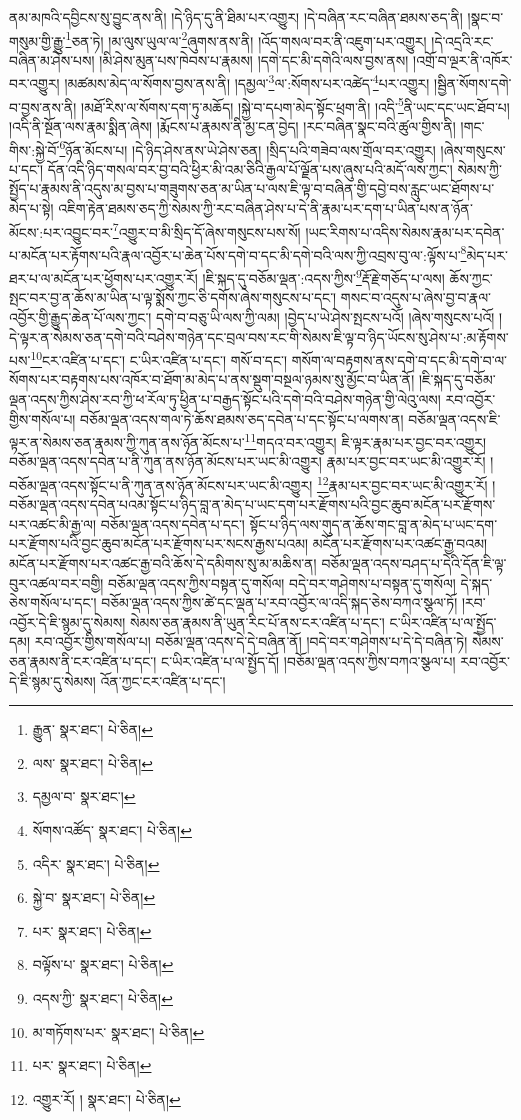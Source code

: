 ནམ་མཁའི་དབྱིངས་སུ་བྱུང་ནས་ནི། །དེ་ཉིད་དུ་ནི་ཐིམ་པར་འགྱུར། །དེ་བཞིན་རང་བཞིན་ཐམས་ཅད་ནི། །སྣང་བ་གསུམ་གྱི་རྒྱུ་\footnote{རྒྱུན་  སྣར་ཐང་།  པེ་ཅིན། }ཅན་ཏེ། །མ་ལུས་ཡུལ་ལ་\footnote{ལས་  སྣར་ཐང་།  པེ་ཅིན། }ཞུགས་ནས་ནི། །འོད་གསལ་བར་ནི་འཇུག་པར་འགྱུར། །དེ་འདྲའི་རང་བཞིན་མ་ཤེས་པས། །མི་ཤེས་མུན་པས་ཁེབས་པ་རྣམས། །དགེ་དང་མི་དགེའི་ལས་བྱས་ནས། །འགྲོ་བ་ལྔར་ནི་འཁོར་བར་འགྱུར། །མཚམས་མེད་ལ་སོགས་བྱས་ནས་ནི། །དམྱལ་\footnote{དམྱལ་བ་  སྣར་ཐང་། }ལ་:སོགས་པར་འཚེད་\footnote{སོགས་འཚོད་  སྣར་ཐང་།  པེ་ཅིན། }པར་འགྱུར། །སྦྱིན་སོགས་དགེ་བ་བྱས་ནས་ནི། །མཐོ་རིས་ལ་སོགས་དག་ཏུ་མཆོད། །སྐྱེ་བ་དཔག་མེད་སྟོང་ཕྲག་ནི། །འདི་\footnote{འདིར་  སྣར་ཐང་།  པེ་ཅིན། }ནི་ཡང་དང་ཡང་ཐོབ་པ། །འདི་ནི་སྔོན་ལས་རྣམ་སྨིན་ཞེས། །རྨོངས་པ་རྣམས་ནི་མྱ་ངན་བྱེད། །རང་བཞིན་སྣང་བའི་ཚུལ་གྱིས་ནི། །གང་གིས་:སྐྱེ་བོ་\footnote{སྐྱེ་བ་  སྣར་ཐང་།  པེ་ཅིན། }ཉོན་མོངས་པ། །དེ་ཉིད་ཤེས་ནས་ཡེ་ཤེས་ཅན། །སྲིད་པའི་གཟེབ་ལས་གྲོལ་བར་འགྱུར། །ཞེས་གསུངས་པ་དང་། དོན་འདི་ཉིད་གསལ་བར་བྱ་བའི་ཕྱིར་མི་འམ་ཅིའི་རྒྱལ་པོ་ལྗོན་པས་ཞུས་པའི་མདོ་ལས་ཀྱང་། སེམས་ཀྱི་སྤྱོད་པ་རྣམས་ནི་འདུས་མ་བྱས་པ་གཟུགས་ཅན་མ་ཡིན་པ་ལས་ཇི་ལྟ་བ་བཞིན་གྱི་དབྱེ་བས་རླུང་ཡང་ཐོགས་པ་མེད་པ་སྟེ། འཇིག་རྟེན་ཐམས་ཅད་ཀྱི་སེམས་ཀྱི་རང་བཞིན་ཤེས་པ་དེ་ནི་རྣམ་པར་དག་པ་ཡིན་པས་ན་ཉོན་མོངས་:པར་འབྱུང་བར་\footnote{པར་  སྣར་ཐང་།  པེ་ཅིན། }འགྱུར་བ་མི་སྲིད་དོ་ཞེས་གསུངས་པས་སོ། །ཡང་རིགས་པ་འདིས་སེམས་རྣམ་པར་དབེན་པ་མངོན་པར་རྟོགས་པའི་རྣལ་འབྱོར་པ་ཆེན་པོས་དགེ་བ་དང་མི་དགེ་བའི་ལས་ཀྱི་འབྲས་བུ་ལ་:ལྟོས་པ་\footnote{བལྟོས་པ་  སྣར་ཐང་།  པེ་ཅིན། }མེད་པར་ཐར་པ་ལ་མངོན་པར་ཕྱོགས་པར་འགྱུར་རོ། །ཇི་སྐད་དུ་བཅོམ་ལྡན་:འདས་ཀྱིས་\footnote{འདས་ཀྱི་  སྣར་ཐང་།  པེ་ཅིན། }རྡོ་རྗེ་གཅོད་པ་ལས། ཆོས་ཀྱང་སྤང་བར་བྱ་ན་ཆོས་མ་ཡིན་པ་ལྟ་སྨོས་ཀྱང་ཅི་དགོས་ཞེས་གསུངས་པ་དང་། གསང་བ་འདུས་པ་ཞེས་བྱ་བ་རྣལ་འབྱོར་གྱི་རྒྱུད་ཆེན་པོ་ལས་ཀྱང་། དགེ་བ་བཅུ་ཡི་ལས་ཀྱི་ལམ། །བྱེད་པ་ཡེ་ཤེས་སྤངས་པའོ། །ཞེས་གསུངས་པའོ། །དེ་ལྟར་ན་སེམས་ཅན་དགེ་བའི་བཤེས་གཉེན་དང་བྲལ་བས་རང་གི་སེམས་ཇི་ལྟ་བ་ཉིད་ཡོངས་སུ་ཤེས་པ་:མ་རྟོགས་པས་\footnote{མ་གཏོགས་པར་  སྣར་ཐང་།  པེ་ཅིན། }ངར་འཛིན་པ་དང་། ང་ཡིར་འཛིན་པ་དང་། གསོ་བ་དང་། གསོག་ལ་བརྟགས་ནས་དགེ་བ་དང་མི་དགེ་བ་ལ་སོགས་པར་བརྟགས་པས་འཁོར་བ་ཐོག་མ་མེད་པ་ནས་སྡུག་བསྔལ་ཉམས་སུ་མྱོང་བ་ཡིན་ནོ། །ཇི་སྐད་དུ་བཅོམ་ལྡན་འདས་ཀྱིས་ཤེས་རབ་ཀྱི་ཕ་རོལ་ཏུ་ཕྱིན་པ་བརྒྱད་སྟོང་པའི་དགེ་བའི་བཤེས་གཉེན་གྱི་ལེའུ་ལས། རབ་འབྱོར་གྱིས་གསོལ་པ། བཅོམ་ལྡན་འདས་གལ་ཏེ་ཆོས་ཐམས་ཅད་དབེན་པ་དང་སྟོང་པ་ལགས་ན། བཅོམ་ལྡན་འདས་ཇི་ལྟར་ན་སེམས་ཅན་རྣམས་ཀྱི་ཀུན་ནས་ཉོན་མོངས་པ་\footnote{པར་  སྣར་ཐང་།  པེ་ཅིན། }གདའ་བར་འགྱུར། ཇི་ལྟར་རྣམ་པར་བྱང་བར་འགྱུར། བཅོམ་ལྡན་འདས་དབེན་པ་ནི་ཀུན་ནས་ཉོན་མོངས་པར་ཡང་མི་འགྱུར། རྣམ་པར་བྱང་བར་ཡང་མི་འགྱུར་རོ། །བཅོམ་ལྡན་འདས་སྟོང་པ་ནི་ཀུན་ནས་ཉོན་མོངས་པར་ཡང་མི་འགྱུར། \footnote{འགྱུར་རོ། །   སྣར་ཐང་།  པེ་ཅིན། }རྣམ་པར་བྱང་བར་ཡང་མི་འགྱུར་རོ། །བཅོམ་ལྡན་འདས་དབེན་པའམ་སྟོང་པ་ཉིད་བླ་ན་མེད་པ་ཡང་དག་པར་རྫོགས་པའི་བྱང་ཆུབ་མངོན་པར་རྫོགས་པར་འཚང་མི་རྒྱ་ལ། བཅོམ་ལྡན་འདས་དབེན་པ་དང་། སྟོང་པ་ཉིད་ལས་གུད་ན་ཆོས་གང་བླ་ན་མེད་པ་ཡང་དག་པར་རྫོགས་པའི་བྱང་ཆུབ་མངོན་པར་རྫོགས་པར་སངས་རྒྱས་པའམ། མངོན་པར་རྫོགས་པར་འཚང་རྒྱ་བའམ། མངོན་པར་རྫོགས་པར་འཚང་རྒྱ་བའི་ཆོས་དེ་དམིགས་སུ་མ་མཆིས་ན། བཅོམ་ལྡན་འདས་བཤད་པ་དེའི་དོན་ཇི་ལྟ་བུར་འཚལ་བར་བགྱི། བཅོམ་ལྡན་འདས་ཀྱིས་བསྟན་དུ་གསོལ། བདེ་བར་གཤེགས་པ་བསྟན་དུ་གསོལ། དེ་སྐད་ཅེས་གསོལ་པ་དང་། བཅོམ་ལྡན་འདས་ཀྱིས་ཚེ་དང་ལྡན་པ་རབ་འབྱོར་ལ་འདི་སྐད་ཅེས་བཀའ་སྩལ་ཏོ། །རབ་འབྱོར་དེ་ཇི་སྙམ་དུ་སེམས། སེམས་ཅན་རྣམས་ནི་ཡུན་རིང་པོ་ནས་ངར་འཛིན་པ་དང་། ང་ཡིར་འཛིན་པ་ལ་སྤྱོད་དམ། རབ་འབྱོར་གྱིས་གསོལ་པ། བཅོམ་ལྡན་འདས་དེ་དེ་བཞིན་ནོ། །བདེ་བར་གཤེགས་པ་དེ་དེ་བཞིན་ཏེ། སེམས་ཅན་རྣམས་ནི་ངར་འཛིན་པ་དང་། ང་ཡིར་འཛིན་པ་ལ་སྤྱོད་དོ། །བཅོམ་ལྡན་འདས་ཀྱིས་བཀའ་སྩལ་པ། རབ་འབྱོར་དེ་ཇི་སྙམ་དུ་སེམས། འོན་ཀྱང་ངར་འཛིན་པ་དང་། 